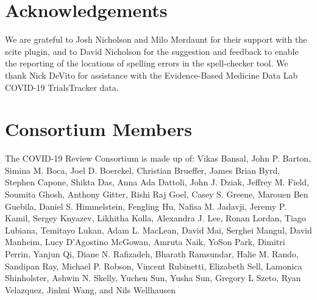\documentclass[sigconf]{acmart}
\begin{document}
\hypertarget{acknowledgements}{%
\section*{Acknowledgements}\label{acknowledgements}}

We are grateful to Josh Nicholson and Milo Mordaunt for their support with the scite plugin, and to David Nicholson for the suggestion and feedback to enable the reporting of the locations of spelling errors in the spell-checker tool.
We thank Nick DeVito for assistance with the Evidence-Based Medicine Data Lab COVID-19 TrialsTracker data.

\hypertarget{consortium}{%
\section*{Consortium Members}\label{consortium}}
The COVID-19 Review Consortium is made up of: Vikas Bansal, John P. Barton, Simina M. Boca, Joel D. Boerckel, Christian Brueffer, James Brian Byrd, Stephen Capone, Shikta Das, Anna Ada Dattoli, John J. Dziak, Jeffrey M. Field, Soumita Ghosh, Anthony Gitter, Rishi Raj Goel, Casey S. Greene, Marouen Ben Guebila, Daniel S. Himmelstein, Fengling Hu, Nafisa M. Jadavji, Jeremy P. Kamil, Sergey Knyazev, Likhitha Kolla, Alexandra J. Lee, Ronan Lordan, Tiago Lubiana, Temitayo Lukan, Adam L. MacLean, David Mai, Serghei Mangul, David Manheim, Lucy D'Agostino McGowan, Amruta Naik, YoSon Park, Dimitri Perrin, Yanjun Qi, Diane N. Rafizadeh, Bharath Ramsundar, Halie M. Rando, Sandipan Ray, Michael P. Robson, Vincent Rubinetti, Elizabeth Sell, Lamonica Shinholster, Ashwin N. Skelly, Yuchen Sun, Yusha Sun, Gregory L Szeto, Ryan Velazquez, Jinhui Wang, and Nils Wellhausen
	
	\balance
	
\end{document}
